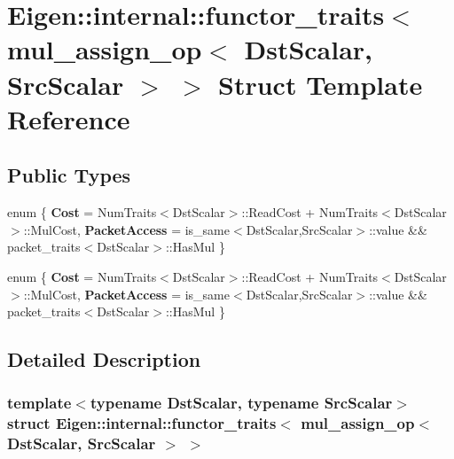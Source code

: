 \hypertarget{struct_eigen_1_1internal_1_1functor__traits_3_01mul__assign__op_3_01_dst_scalar_00_01_src_scalar_01_4_01_4}{}\section{Eigen\+:\+:internal\+:\+:functor\+\_\+traits$<$ mul\+\_\+assign\+\_\+op$<$ Dst\+Scalar, Src\+Scalar $>$ $>$ Struct Template Reference}
\label{struct_eigen_1_1internal_1_1functor__traits_3_01mul__assign__op_3_01_dst_scalar_00_01_src_scalar_01_4_01_4}
\subsection*{Public Types}
\begin{DoxyCompactItemize}
\item 
\mbox{\label{struct_eigen_1_1internal_1_1functor__traits_3_01mul__assign__op_3_01_dst_scalar_00_01_src_scalar_01_4_01_4_a00d6912a254b4fd4397e15def49942b1}} 
enum \{ {\bfseries Cost} = Num\+Traits$<$Dst\+Scalar$>$\+:\+:Read\+Cost + Num\+Traits$<$Dst\+Scalar$>$\+:\+:Mul\+Cost, 
{\bfseries Packet\+Access} = is\+\_\+same$<$Dst\+Scalar,Src\+Scalar$>$\+:\+:value \&\& packet\+\_\+traits$<$Dst\+Scalar$>$\+:\+:Has\+Mul
 \}
\item 
\mbox{\label{struct_eigen_1_1internal_1_1functor__traits_3_01mul__assign__op_3_01_dst_scalar_00_01_src_scalar_01_4_01_4_a663dc1d81eb47cb93875925d69f9dd19}} 
enum \{ {\bfseries Cost} = Num\+Traits$<$Dst\+Scalar$>$\+:\+:Read\+Cost + Num\+Traits$<$Dst\+Scalar$>$\+:\+:Mul\+Cost, 
{\bfseries Packet\+Access} = is\+\_\+same$<$Dst\+Scalar,Src\+Scalar$>$\+:\+:value \&\& packet\+\_\+traits$<$Dst\+Scalar$>$\+:\+:Has\+Mul
 \}
\end{DoxyCompactItemize}


\subsection{Detailed Description}
\subsubsection*{template$<$typename Dst\+Scalar, typename Src\+Scalar$>$\newline
struct Eigen\+::internal\+::functor\+\_\+traits$<$ mul\+\_\+assign\+\_\+op$<$ Dst\+Scalar, Src\+Scalar $>$ $>$}




